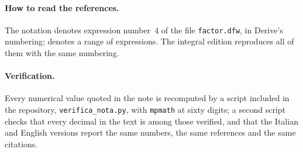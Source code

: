\paragraph{How to read the references.}
The notation  denotes expression number~4 of the file
\texttt{factor.dfw}, in Derive's numbering;  denotes a
range of expressions. The integral edition reproduces all of them with the
same numbering.

\paragraph{Verification.}
Every numerical value quoted in the note is recomputed by a script included in
the repository, \texttt{verifica\_nota.py}, with \texttt{mpmath} at sixty
digits; a second script checks that every decimal in the text is among those
verified, and that the Italian and English versions report the same numbers,
the same references and the same citations.
